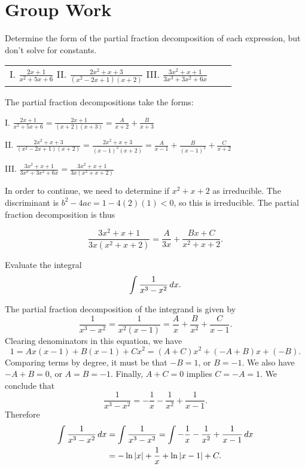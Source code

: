 \documentclass[noauthor, handout]{ximera}
\begin{document}
\section{Group Work}

\begin{problem}
Determine the form of the partial fraction decomposition of each expression, but don't solve for constants.
\begin{center}
\begin{tabular}{lll}
I. $\frac{2x+1}{x^2+5x+6}$ \hspace{.2in} II. $\frac{2x^2+x+3}{(x^2-2x+1)(x+2)}$ \hspace{.2in} III. $\frac{3x^2+x+1}{3x^3+3x^2+6x}$
\end{tabular}
\end{center}
\end{problem}

\begin{freeResponse}
The partial fraction decompositions take the forms:

I. $\frac{2x+1}{x^2+5x+6} = \frac{2x+1}{(x+2)(x+3)} = \frac{A}{x+2} + \frac{B}{x+3}$

II. $\frac{2x^2+x+3}{(x^2-2x+1)(x+2)} = \frac{2x^2+x+3}{(x-1)^2(x+2)} = \frac{A}{x-1} + \frac{B}{(x-1)^2} + \frac{C}{x+2}$

III. $\frac{3x^2+x+1}{3x^3+3x^2+6x} = \frac{3x^2 + x + 1}{3x(x^2+x + 2)} $

In order to continue, we need to determine if $x^2+x + 2$ as irreducible.  The discriminant is $b^2-4ac = 1-4(2)(1) <0$, so this is irreducible.  The partial fraction decomposition is thus

\[
\frac{3x^2 + x + 1}{3x(x^2+x + 2)} = \frac{A}{3x}+\frac{Bx+C}{x^2+x+2}.
\]
\end{freeResponse}

\begin{problem}
Evaluate the integral
$$
\int \frac{1}{x^3-x^2} \mathop{}\!d x.
$$
\end{problem}

\begin{freeResponse}
The partial fraction decomposition of the integrand is given by 
$$
\frac{1}{x^3-x^2} = \frac{1}{x^2(x-1)} = \frac{A}{x} + \frac{B}{x^2} + \frac{C}{x-1}.
$$
Clearing denominators in this equation, we have
$$
1 = Ax(x-1) + B(x-1) + Cx^2 = (A + C)x^2 + (-A + B) x + (-B).
$$
Comparing terms by degree, it must be that $-B = 1$, or $B=-1$. We also have $-A+B = 0$, or $A=B=-1$. Finally, $A+C=0$ implies $C = -A = 1$. We conclude that 
$$
\frac{1}{x^3-x^2} = -\frac{1}{x} - \frac{1}{x^2} + \frac{1}{x-1}.
$$
Therefore
\begin{align*}
\int \frac{1}{x^3-x^2} \mathop{}\!d x &= \int \frac{1}{x^3-x^2} = \int -\frac{1}{x} - \frac{1}{x^2} + \frac{1}{x-1}\mathop{}\!d x  \\
&= -\ln |x| + \frac{1}{x} + \ln |x-1| + C.
\end{align*} 
\end{freeResponse}
\end{document}
